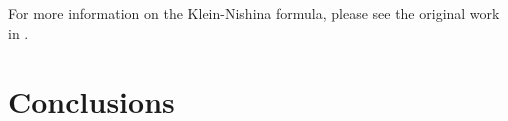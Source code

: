\documentclass[11pt]{article}
\begin{document}
For more information on the Klein-Nishina formula, please see the original work
in \cite{klein1928scattering}.

\section{Conclusions}



\end{document}
